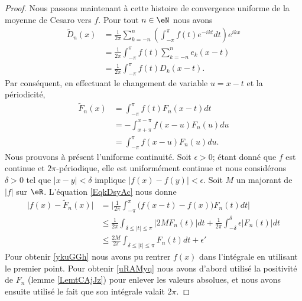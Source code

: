 \begin{proof}
    Nous passons maintenant à cette histoire de convergence uniforme de la moyenne de Cesaro vers \( f\). Pour tout \( n\in \eN\) nous avons
    \begin{subequations}
        \begin{align}
            \tilde  D_n(x)&=\frac{1}{ 2\pi }\sum_{k=-n}^n\left( \int_{-\pi}^{\pi}f(t) e^{-ikt}dt \right) e^{ikx}\\
            &=\frac{1}{ 2\pi }\int_{-\pi}^{\pi}f(t)\sum_{k=-n}^ne_k(x-t)\\
            &=\frac{1}{ 2\pi }\int_{-\pi}^{\pi}f(t)D_k(x-t).
        \end{align}
    \end{subequations}
    Par conséquent, en effectuant le changement de variable \( u=x-t\) et la périodicité,
    \begin{subequations}    \label{EqkDsyAc}
        \begin{align}
            \tilde F_n(x)&=\int_{-\pi}^{\pi}f(t)F_n(x-t)dt\\
            &=-\int_{x+\pi}^{x-\pi}f(x-u)F_n(u)du\\
            &=\int_{-\pi}^{\pi}f(x-u) F_n(u)du.
        \end{align}
    \end{subequations}
    Nous prouvons à présent l'uniforme continuité. Soit \( \epsilon>0\); étant donné que \( f\) est continue et \( 2\pi\)-périodique, elle est uniformément continue et nous considérons \( \delta>0\) tel que \( | x-y |<\delta\) implique \( \big| f(x)-f(y) \big|<\epsilon\). Soit \( M\) un majorant de \( | f |\) sur \( \eR\). L'équation \eqref{EqkDsyAc} nous donne
    \begin{subequations}
        \begin{align}
            \big| f(x)-\tilde F_n(x) \big|&=\big| \frac{1}{ 2\pi }\int_{-\pi}^{\pi}\big( f(x-t)-f(x) \big)F_n(t)dt \big|    \label{ykuGGh}\\
            &\leq\frac{1}{ 2\pi }\int_{\delta\leq| t |\leq \pi}| 2MF_n(t) |dt+\frac{1}{ 2\pi }\int_{-\delta}^{\delta}\epsilon| F_n(t) |dt\\
            &\leq\frac{ 2M }{ 2\pi }\int_{\delta\leq | t |\leq\pi}F_n(t)dt+\epsilon'    \label{uRAMyq}
        \end{align}
    \end{subequations}
    Pour obtenir \eqref{ykuGGh} nous avons pu rentrer \( f(x)\) dans l'intégrale en utilisant le premier point. Pour obtenir \eqref{uRAMyq} nous avons d'abord utilisé la positivité de \( F_n\) (lemme \ref{LemtCAjJz}) pour enlever les valeurs absolues, et nous avons ensuite utilisé le fait que son intégrale valait \( 2\pi\).


\end{proof}
